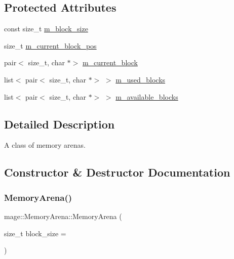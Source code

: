 \subsection*{Protected Attributes}
\begin{DoxyCompactItemize}
\item 
const size\+\_\+t \hyperlink{classmage_1_1_memory_arena_a18177c245b045c5536330ffed284ed4d}{m\+\_\+block\+\_\+size}
\item 
size\+\_\+t \hyperlink{classmage_1_1_memory_arena_a880d07eb372ce1c8b907947fcbdfc59c}{m\+\_\+current\+\_\+block\+\_\+pos}
\item 
pair$<$ size\+\_\+t, char $\ast$$>$ \hyperlink{classmage_1_1_memory_arena_ab2d39233b1e64239baea519a2d073b04}{m\+\_\+current\+\_\+block}
\item 
list$<$ pair$<$ size\+\_\+t, char $\ast$$>$ $>$ \hyperlink{classmage_1_1_memory_arena_a9fc33bafde45afe06d05732572f415d1}{m\+\_\+used\+\_\+blocks}
\item 
list$<$ pair$<$ size\+\_\+t, char $\ast$$>$ $>$ \hyperlink{classmage_1_1_memory_arena_a89c4f1d2b4d5e05bb46fa303d70428c4}{m\+\_\+available\+\_\+blocks}
\end{DoxyCompactItemize}


\subsection{Detailed Description}
A class of memory arena\textquotesingle{}s. 

\subsection{Constructor \& Destructor Documentation}
\hypertarget{classmage_1_1_memory_arena_ac90beb8cf8dc42944a0fd6a4a9e8355c}{}\label{classmage_1_1_memory_arena_ac90beb8cf8dc42944a0fd6a4a9e8355c} 
\subsubsection{\texorpdfstring{Memory\+Arena()}{MemoryArena()}\hspace{0.1cm}{\footnotesize\ttfamily [1/2]}}
{\footnotesize\ttfamily mage\+::\+Memory\+Arena\+::\+Memory\+Arena (\begin{DoxyParamCaption}\item[{size\+\_\+t}]{block\+\_\+size = {} }\end{DoxyParamCaption})}

